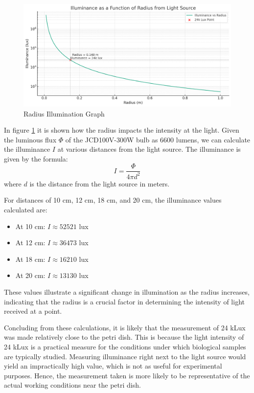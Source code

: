 \begin{figure}
    \centering
    \includegraphics[width=\linewidth]{radius-illumination.jpg}
    \caption{Radius Illumination Graph}
    \label{fig:radius-illumination}
\end{figure}

In figure \ref{fig:radius-illumination} it is shown how the radius impacts the intensity at the light. 
Given the luminous flux \( \Phi \) of the JCD100V-300W bulb as 6600 lumens, we can calculate the illuminance \( I \) at various distances from the light source. The illuminance is given by the formula:
\[ I = \frac{\Phi}{4\pi d^2} \]
where \( d \) is the distance from the light source in meters.

For distances of 10 cm, 12 cm, 18 cm, and 20 cm, the illuminance values calculated are:

\begin{itemize}
    \item At 10 cm: \( I \approx 52521 \) lux
    \item At 12 cm: \( I \approx 36473 \) lux
    \item At 18 cm: \( I \approx 16210 \) lux
    \item At 20 cm: \( I \approx 13130 \) lux
\end{itemize}

These values illustrate a significant change in illumination as the radius increases, indicating that the radius is a crucial factor in determining the intensity of light received at a point.

Concluding from these calculations, it is likely that the measurement of 24 kLux was made relatively close to the petri dish. This is because the light intensity of 24 kLux is a practical measure for the conditions under which biological samples are typically studied. Measuring illuminance right next to the light source would yield an impractically high value, which is not as useful for experimental purposes. Hence, the measurement taken is more likely to be representative of the actual working conditions near the petri dish.


